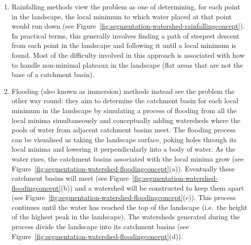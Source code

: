\documentclass[a4paper]{article}
\begin{document}
\begin{enumerate}

\item Rainfalling methods \cite{meijster98,osma-ruiz06,stoev00} view the problem as one of determining, for each point in the landscape, the local minimum to which water placed at that point would run down (see Figure~\ref{fig:segmentation-watershed-rainfallingconcept}). In practical terms, this generally involves finding a path of steepest descent from each point in the landscape and following it until a local minimum is found. Most of the difficulty involved in this approach is associated with how to handle non-minimal plateaux in the landscape (flat areas that are not the base of a catchment basin).

\item Flooding (also known as immersion) methods \cite{bieniek00,rambabu07} instead see the problem the other way round: they aim to determine the catchment basin for each local minimum in the landscape by simulating a process of flooding from all the local minima simultaneously and conceptually adding watersheds where the pools of water from adjacent catchment basins meet. The flooding process can be visualised as taking the landscape surface, poking holes through its local minima and lowering it perpendicularly into a body of water. As the water rises, the catchment basins associated with the local minima grow (see Figure~\ref{fig:segmentation-watershed-floodingconcept}(a)). Eventually these catchment basins will meet (see Figure~\ref{fig:segmentation-watershed-floodingconcept}(b)) and a watershed will be constructed to keep them apart (see Figure~\ref{fig:segmentation-watershed-floodingconcept}(c)). This process continues until the water has reached the top of the landscape (i.e.~the height of the highest peak in the landscape). The watersheds generated during the process divide the landscape into its catchment basins (see Figure~\ref{fig:segmentation-watershed-floodingconcept}(d)).

\end{enumerate}
\end{document}
